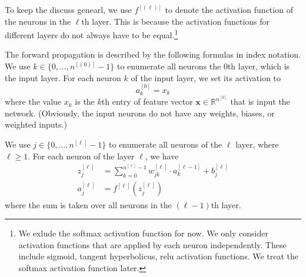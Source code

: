 \documentclass[12pt]{article}
\newcommand{\R}{\mathbb{R}}
\newcommand{\x}{\boldsymbol{x}}
\newcommand{\y}{\boldsymbol{y}}
\begin{document}
\medskip
\begin{center}
\end{center}

To keep the discuss genearl, we use $f^{[(\ell)]}$ to denote the activation function of the neurons in the $\ell$th layer. This is because the activation functions for different layers do not always have to be equal.\footnote{We exlude the softmax activation function for now. We only consider activation functions that are applied by each neuron independently. These include sigmoid, tangent hyperbolicus, relu activation functions. We treat the softmax activation function later.}

The forward propagation is described by the following formulas in index notation. We use $k\in\{0,\ldots,n^{[(0)]}-1\}$ to enumerate all neurons the $0$th layer, which is the input layer. For each neuron $k$ of the input layer, we set its activation to
\begin{equation}
  a^{[0]}_k = x_k
\end{equation}
where the value $x_k$ is the $k$th entry of feature vector $\x\in\R^{n^{[0]}}$ that is input the network. (Obviously, the input neurons do not have any weights, biases, or weighted inputs.)

We use $j\in\{0,\ldots,n^{[\ell]}-1\}$ to enumerate all neurons of the $\ell$ layer, where $\ell\ge 1$. For each neuron of the layer $\ell$, we have
\begin{align}
z^{[\ell]}_j &= \sum_{k=0}^{n^{[\ell]}-1} w^{[\ell]}_{jk} \cdot a^{[\ell-1]}_k + b^{[\ell]}_j \\
a^{[\ell]}_j &= f^{[\ell]}(z^{[\ell]}_j)
\end{align}
where the sum is taken over all neurons in the $(\ell-1)$th layer. 
\end{document}
